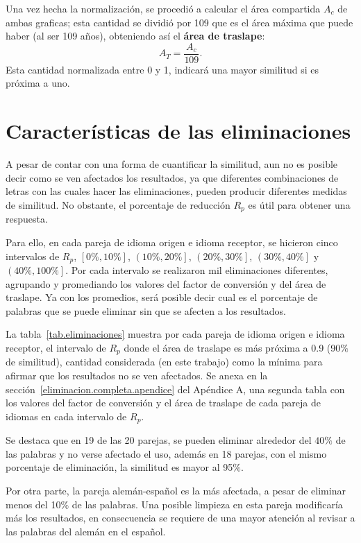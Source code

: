 Una vez hecha la normalización, se procedió a calcular el área compartida  $A_{c}$ de ambas graficas; esta cantidad se dividió por 109 que es el área máxima que puede haber (al ser 109 años), obteniendo así el \textbf{área de traslape}:
\begin{equation}
A_{T} = \frac{A_{c}}{109}.
\label{ec.atraslape}
\end{equation}
Esta cantidad normalizada entre 0 y 1, indicará una mayor similitud si es próxima a uno.

\section{Características de las eliminaciones}

A pesar de contar con una forma de cuantificar la similitud, aun no es posible decir como se ven afectados los resultados, ya que diferentes combinaciones de letras con las cuales hacer las eliminaciones, pueden producir diferentes medidas de similitud.  No obstante, el porcentaje de reducción $R_{p}$ es útil para obtener una respuesta.

Para ello, en cada pareja de idioma origen e idioma receptor, se hicieron cinco intervalos de $R_{p}$, $\left[0\%, 10\% \right]$, $\left( 10\%, 20\% \right]$, $\left( 20\%, 30\% \right]$, $\left( 30\%, 40\% \right]$ y $\left( 40\%, 100\% \right]$. Por cada intervalo se realizaron mil eliminaciones diferentes, agrupando y promediando los valores del factor de conversión y del área de traslape.  Ya con los promedios, será posible decir cual es el porcentaje de palabras que se puede eliminar sin que se afecten a los resultados. 

La tabla~\ref{tab.eliminaciones} muestra por cada pareja de idioma origen e idioma receptor, el intervalo de $R_{p}$ donde el área de traslape es más próxima a 0.9 (90$\%$ de similitud), cantidad considerada (en este trabajo) como la mínima para afirmar que los resultados no se ven afectados.  Se anexa en la sección~\ref{eliminacion.completa.apendice} del Apéndice A, una segunda tabla con los valores del factor de conversión y el área de traslape de cada pareja de idiomas en cada intervalo de $R_{p}$.

Se destaca que en 19 de las 20 parejas, se pueden eliminar alrededor del $40\%$ de las palabras y
no verse afectado el uso, además en 18 parejas, con el mismo porcentaje de eliminación, la similitud es mayor al 95$\%$. 

Por otra parte, la pareja alemán-español es la más afectada, a pesar de eliminar menos del 10$\%$ de las palabras. Una posible limpieza en esta pareja modificaría más los resultados, en consecuencia se requiere de una mayor atención al revisar a las palabras del alemán en el español. 

